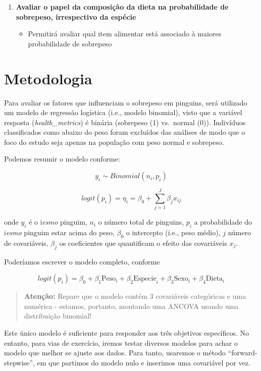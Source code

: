 \documentclass[
]{book}
\providecommand{\tightlist}{%
  \setlength{\itemsep}{0pt}\setlength{\parskip}{0pt}}
\begin{document}
\begin{enumerate}
\def\labelenumi{(\roman{enumi})}
\setcounter{enumi}{1}
\tightlist
\item
  \textbf{Avaliar o papel da composição da dieta na probabilidade de sobrepeso, irrespectivo da espécie}

  \begin{itemize}
  \tightlist
  \item
    Permitirá avaliar qual item alimentar está associado à maiores probabilidade de sobrepeso
  \end{itemize}
\end{enumerate}

\section{Metodologia}\label{metodologia}

Para avaliar os fatores que influenciam o sobrepeso em pinguins, será utilizado um modelo de regressão logística (i.e., modelo binomial), visto que a variável resposta (\emph{health\_metrics}) é binária (sobrepeso (1) vs.~normal (0)). Indivíduos classificados como abaixo do peso foram excluídos das análises de modo que o foco do estudo seja apenas na população com peso normal e sobrepeso.

Podemos resumir o modelo conforme:

\[y_i \sim Binomial(n_i, p_i)\]

\[logit(p_i) = \eta_i 
= \beta_0 +\sum_{j=1}^{J} \beta_j x_{ij}\]

onde \(y_i\) é o i\emph{esmo} pinguim, \(n_i\) o número total de pinguins, \(p_i\) a probabilidade do i\emph{esmo} pinguim estar acima do peso, \(\beta_0\) o intercepto (i.e., peso médio), \(j\) número de covariáveis, \(\beta_j\) os coeficientes que quantificam o efeito das covariáveis \(x_j\).

Poderíamos escrever o modelo completo, conforme

\[logit(p_i) = \beta_0 + \beta_1\text{Peso}_i+ \beta_2\text{Especie}_i + \beta_3\text{Sexo}_i + \beta_4\text{Dieta}_i\]

\begin{quote}
\textbf{Atenção:} Repare que o modelo contém 3 covariáveis categóricas e uma numérica - estamos, portanto, montando uma ANCOVA usando uma distribuição binomial!
\end{quote}

Este único modelo é suficiente para responder aos três objetivos específicos. No entanto, para vias de exercício, iremos testar diversos modelos para achar o modelo que melhor se ajuste aos dados. Para tanto, usaremos o método ``forward-stepwise'', em que partimos do modelo nulo e inserimos uma covariável por vez.
\end{document}
